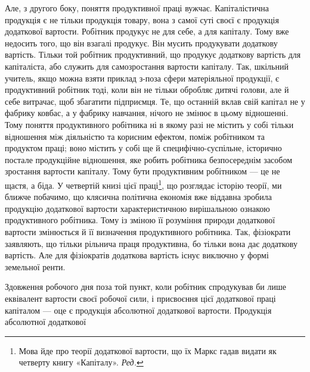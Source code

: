 Але, з другого боку, поняття продуктивної праці вужчає.
Капіталістична продукція є не тільки продукція товару, вона
з самої суті своєї є продукція додаткової вартости. Робітник
продукує не для себе, а для капіталу. Тому вже недосить того,
що він взагалі продукує. Він мусить продукувати додаткову
вартість. Тільки той робітник продуктивний, що продукує додаткову
вартість для капіталіста, або служить для самозростання
вартости капіталу. Так, шкільний учитель, якщо можна
взяти приклад з-поза сфери матеріяльної продукції, є продуктивний
робітник тоді, коли він не тільки обробляє дитячі голови,
але й себе витрачає, щоб збагатити підприємця. Те, що останній
вклав свій капітал не у фабрику ковбас, а у фабрику навчання,
нічого не змінює в цьому відношенні. Тому поняття продуктивного
робітника ні в якому разі не містить у собі тільки відношення
між діяльністю та корисним ефектом, поміж робітником та продуктом
праці; воно містить у собі ще й специфічно-суспільне,
історично постале продукційне відношення, яке робить робітника
безпосереднім засобом зростання вартости капіталу. Тому бути
продуктивним робітником — це не щастя, а біда. У четвертій
книзі цієї праці\footnote*{
Мова йде про теорії додаткової вартости, що їх Маркс гадав видати
як четверту книгу «Капіталу». \emph{Ред.}
}, що розглядає історію теорії, ми ближче побачимо,
що клясична політична економія вже віддавна зробила
продукцію додаткової вартости характеристичною вирішальною
ознакою продуктивного робітника. Тому із зміною її розуміння
природи додаткової вартости змінюється й її визначення продуктивного
робітника. Так, фізіократи заявляють, що тільки
рільнича праця продуктивна, бо тільки вона дає додаткову вартість.
Але для фізіократів додаткова вартість існує виключно
у формі земельної ренти.

Здовження робочого дня поза той пункт, коли робітник спродукував
би лише еквівалент вартости своєї робочої сили, і присвоєння
цієї додаткової праці капіталом — оце є продукція
абсолютної додаткової вартости. Продукція абсолютної додаткової
\parbreak{}  %
